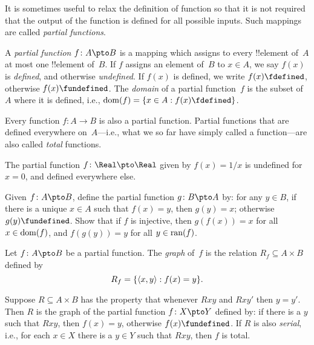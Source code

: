 \documentclass[../../../include/open-logic-section]{subfiles}
\begin{document}


\begin{explain}
It is sometimes useful to relax the definition of function so that it
is not required that the output of the function is defined for all
possible inputs. Such mappings are called \emph{partial functions}.
\end{explain}

\begin{defn}
A \emph{partial function} $f \colon A \pto B$ is a mapping which
assigns to every !!{element} of~$A$ at most one !!{element} of~$B$.
If $f$ assigns an element of~$B$ to $x \in A$, we say $f(x)$ is
\emph{defined}, and otherwise \emph{undefined}. If $f(x)$ is defined,
we write $f(x) \fdefined$, otherwise $f(x) \fundefined$. The
\emph{domain} of a partial function~$f$ is the subset of~$A$ where it
is defined, i.e., $\dom{f} = \Setabs{x \in A}{f(x) \fdefined}$.
\end{defn}

\begin{ex}
Every function $f\colon A \to B$ is also a partial function. Partial
functions that are defined everywhere on~$A$---i.e., what we so far
have simply called a function---are also called \emph{total}
functions.
\end{ex}

\begin{ex}
The partial function $f \colon \Real \pto \Real$ given by $f(x) = 1/x$
is undefined for $x = 0$, and defined everywhere else.
\end{ex}

\begin{prob}
Given $f\colon A \pto B$, define the partial function $g\colon B \pto
A$ by: for any $y \in B$, if there is a unique $x \in A$ such that
$f(x) = y$, then $g(y) = x$; otherwise $g(y) \fundefined$.  Show that
if $f$ is injective, then $g(f(x)) = x$ for all $x \in \mathrm{dom}(f)$, and
$f(g(y)) = y$ for all $y \in \mathrm{ran}(f)$.
\end{prob}

\begin{defn}
Let $f\colon A \pto B$ be a partial function. The \emph{graph} of~$f$
is the relation $R_f \subseteq A \times B$ defined by
\[
R_f = \{ \langle x,y \rangle : f(x) = y \}.
\]
\end{defn}

\begin{prop}
Suppose $R \subseteq A \times B$ has the property that whenever $Rxy$
and $Rxy'$ then $y = y'$.  Then $R$ is the graph of the partial
function $f\colon X \pto Y$ defined by: if there is a $y$ such that
$Rxy$, then $f(x) = y$, otherwise $f(x) \fundefined$.  If $R$ is also
\emph{serial}, i.e., for each $x \in X$ there is a $y \in Y$ such that
$Rxy$, then $f$ is total.
\end{prop}
\end{document}
